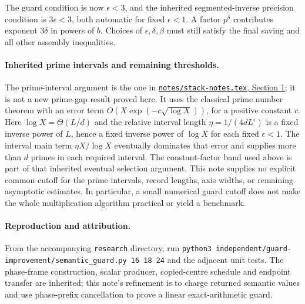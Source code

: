 \documentclass[11pt]{article}
\begin{document}
The guard condition is now $\epsilon<3$, and the inherited segmented-inverse
precision condition is $3\epsilon<3$, both automatic for fixed
$\epsilon<1$. A factor $p^\delta$ contributes exponent $3\delta$ in powers
of $b$. Choices of $\epsilon,\delta,\beta$ must still satisfy the final
saving and all other assembly inequalities.

\paragraph{Inherited prime intervals and remaining thresholds.}
The prime-interval argument is the one in
\href{https://github.com/Swapnil-jain/integer-mult-kappa/blob/f2176bc/notes/stack-notes.tex}
{\texttt{notes/stack-notes.tex}, Section 1}; it is not a new prime-gap result
proved here. It uses the classical prime number theorem with an error term
$O(X\exp(-c\sqrt{\log X}))$, for a positive constant $c$.
Here $\log X=\Theta(L/d)$ and the relative interval length
$\eta=1/(4dL^\epsilon)$ is a fixed inverse power of $L$, hence a fixed
inverse power of $\log X$ for each fixed $\epsilon<1$.
The interval main term $\eta X/\log X$ eventually dominates that error
and supplies more than $d$ primes in each required interval. The constant-factor band
used above is part of that inherited eventual selection argument.
This note supplies no explicit common cutoff for the prime intervals,
record lengths, axis widths, or remaining asymptotic estimates. In
particular, a small numerical guard cutoff does not make the whole
multiplication algorithm practical or yield a benchmark.

\paragraph{Reproduction and attribution.}
From the accompanying \texttt{research} directory, run
\texttt{python3 independent/guard-improvement/semantic\_guard.py 16 18 24}
and the adjacent unit tests. The phase-frame construction, scalar
producer, copied-centre schedule and endpoint transfer are inherited;
this note's refinement is to charge returned semantic values and use
phase-prefix cancellation to prove a linear exact-arithmetic guard.
\end{document}
